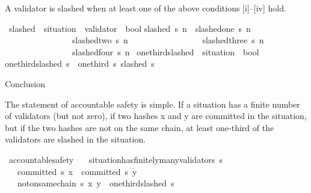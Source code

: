 \documentclass{beamer}
\begin{document}
\begin{frame}
\begin{isamarkuptext}%
A validator is slashed when at least one of the above conditions [i]--[iv] hold.%
\end{isamarkuptext}\isamarkuptrue%
\isamarkupfalse%
\ slashed\ {\isacharcolon}{\isacharcolon}\ {\isachardoublequoteopen}situation\ {\isasymRightarrow}\ validator\ {\isasymRightarrow}\ bool{\isachardoublequoteclose}\isanewline
{}\isanewline
{\isachardoublequoteopen}slashed\ s\ n\ {\isacharequal}\ {\isacharparenleft}slashed{\isacharunderscore}one\ s\ n\ {\isasymor}\isanewline
\ \ \ \ \ \ \ \ \ \ \ \ \ \ \ \ slashed{\isacharunderscore}two\ s\ n\ {\isasymor}\isanewline
\ \ \ \ \ \ \ \ \ \ \ \ \ \ \ \ slashed{\isacharunderscore}three\ s\ n\ {\isasymor}\isanewline
\ \ \ \ \ \ \ \ \ \ \ \ \ \ \ \ slashed{\isacharunderscore}four\ s\ n{\isacharparenright}{\isachardoublequoteclose}\isanewline
\isanewline
{}\isamarkupfalse%
\ one{\isacharunderscore}third{\isacharunderscore}slashed\ {\isacharcolon}{\isacharcolon}\ {\isachardoublequoteopen}situation\ {\isasymRightarrow}\ bool{\isachardoublequoteclose}\isanewline
{}\isanewline
{\isachardoublequoteopen}one{\isacharunderscore}third{\isacharunderscore}slashed\ s\ {\isacharequal}\ one{\isacharunderscore}third\ s\ {\isacharparenleft}slashed\ s{\isacharparenright}{\isachardoublequoteclose}%
\end{frame}

\begin{frame}{Conclusion}
\begin{isamarkuptext}%
The statement of accountable safety is simple.  If a situation has a finite number of validators (but not zero),
if two hashes x and y are committed in the situation, but if the two hashes are not on the same chain,
at least one-third of the validators are slashed in the situation.%
\end{isamarkuptext}\isamarkuptrue%
\isamarkupfalse%
\ accountable{\isacharunderscore}safety\ {\isacharcolon}\isanewline
\ \ {\isachardoublequoteopen}situation{\isacharunderscore}has{\isacharunderscore}finitely{\isacharunderscore}many{\isacharunderscore}validators\ s\ {\isasymLongrightarrow}\isanewline
\ \ \ committed\ s\ x\ {\isasymLongrightarrow}\ committed\ s\ y\ {\isasymLongrightarrow}\isanewline
\ \ \ not{\isacharunderscore}on{\isacharunderscore}same{\isacharunderscore}chain\ s\ x\ y\ {\isasymLongrightarrow}\ one{\isacharunderscore}third{\isacharunderscore}slashed\ s{\isachardoublequoteclose}\isanewline
\end{frame}
\end{document}
